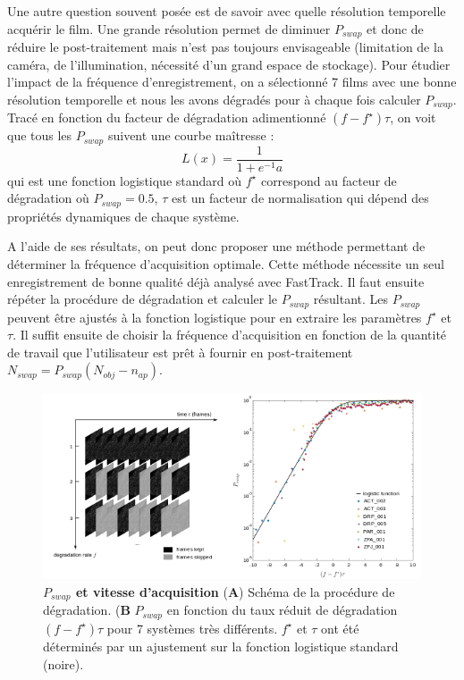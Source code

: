 	Une autre question souvent posée est de savoir avec quelle résolution temporelle acquérir le film. Une grande résolution permet de diminuer $P_{swap}$ et donc de réduire le post-traitement mais n'est pas toujours envisageable (limitation de la caméra, de l'illumination, nécessité d'un grand espace de stockage).
	Pour étudier l'impact de la fréquence d'enregistrement, on a sélectionné 7 films avec une bonne résolution temporelle et nous les avons dégradés pour à chaque fois calculer $P_{swap}$. Tracé en fonction du facteur de dégradation adimentionné $(f-f^{\star})\tau$, on voit que tous les $P_{swap}$ suivent une courbe maîtresse :
	$$
	    L(x)=\frac{1}{1+e^{-1}a}
	$$
	qui est une fonction logistique standard où $f^{\star}$ correspond au facteur de dégradation où $P_{swap}=0.5$, $\tau$ est un facteur de normalisation qui dépend des propriétés dynamiques de chaque système.
\medbreak
	
	A l'aide de ses résultats, on peut donc proposer une méthode permettant de déterminer la fréquence d'acquisition optimale. Cette méthode nécessite un seul enregistrement de bonne qualité déjà analysé avec FastTrack. Il faut ensuite répéter la procédure de dégradation et calculer le $P_{swap}$ résultant. Les $P_{swap}$ peuvent être ajustés à la fonction logistique pour en extraire les paramètres $f^{\star}$ et $\tau$. Il suffit ensuite de choisir la fréquence d'acquisition en fonction de la quantité de travail que l'utilisateur est prêt à fournir en post-traitement $N_{swap}=P_{swap}(N_{obj}-n_{ap})$.
	
	\begin{figure}[h]
    \centering
    \includegraphics[width=1\textwidth]{part_1/assets/Figure_5.png}    
    \caption{\textbf{$P_{swap}$ et vitesse d’acquisition} (\textbf{A}) Schéma de la procédure de dégradation. (\textbf{B} $P_{swap}$ en fonction du taux réduit de dégradation $(f-f^{\star})\tau$ pour 7 systèmes très différents. $f^{\star}$ et $\tau$ ont été déterminés par un ajustement sur la fonction logistique standard (noire).}
    \label{part_1:fig_5}
    \end{figure}
	
